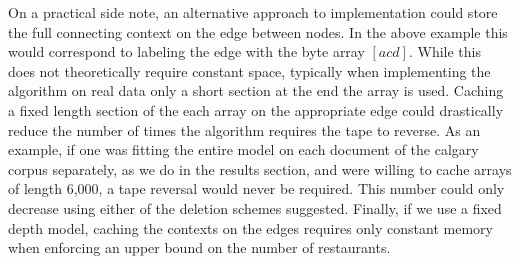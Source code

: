 \documentclass[12pt]{amsart}
\begin{document}
On a practical side note, an alternative approach to implementation could store the full connecting context on the edge between nodes.  In the above example this would correspond to labeling the edge with the byte array $[acd]$.  While this does not theoretically require constant space, typically when implementing the algorithm on real data only a short section at the end the array is used.  Caching a fixed length section of the each array on the appropriate edge could drastically reduce the number of times the algorithm requires the tape to reverse.  As an example, if one was fitting the entire model on each document of the calgary corpus separately, as we do in the results section, and were willing to cache arrays of length 6,000, a tape reversal would never be required.  This number could only decrease using either of the deletion schemes suggested.  Finally, if we use a fixed depth model, caching the contexts on the edges requires only constant memory when enforcing an upper bound on the number of restaurants.
\end{document}
